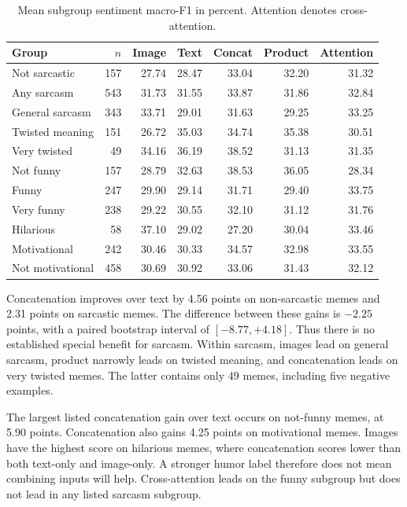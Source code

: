 \documentclass[11pt,a4paper]{article}
\begin{document}
\begin{table}[htbp]
\centering\small
\begin{tabular}{lrrrrrr}
\toprule
Group & $n$ & Image & Text & Concat & Product & Attention \\
\midrule
Not sarcastic & 157 & 27.74 & 28.47 & 33.04 & 32.20 & 31.32 \\
Any sarcasm & 543 & 31.73 & 31.55 & 33.87 & 31.86 & 32.84 \\
General sarcasm & 343 & 33.71 & 29.01 & 31.63 & 29.25 & 33.25 \\
Twisted meaning & 151 & 26.72 & 35.03 & 34.74 & 35.38 & 30.51 \\
Very twisted & 49 & 34.16 & 36.19 & 38.52 & 31.13 & 31.35 \\
Not funny & 157 & 28.79 & 32.63 & 38.53 & 36.05 & 28.34 \\
Funny & 247 & 29.90 & 29.14 & 31.71 & 29.40 & 33.75 \\
Very funny & 238 & 29.22 & 30.55 & 32.10 & 31.12 & 31.76 \\
Hilarious & 58 & 37.10 & 29.02 & 27.20 & 30.04 & 33.46 \\
Motivational & 242 & 30.46 & 30.33 & 34.57 & 32.98 & 33.55 \\
Not motivational & 458 & 30.69 & 30.92 & 33.06 & 31.43 & 32.12 \\
\bottomrule
\end{tabular}
\caption{Mean subgroup sentiment macro-F1 in percent. Attention denotes cross-attention.}
\label{tab:groups}
\end{table}

Concatenation improves over text by 4.56 points on non-sarcastic memes and 2.31 points on sarcastic memes. The difference between these gains is $-2.25$ points, with a paired bootstrap interval of $[-8.77,+4.18]$. Thus there is no established special benefit for sarcasm. Within sarcasm, images lead on general sarcasm, product narrowly leads on twisted meaning, and concatenation leads on very twisted memes. The latter contains only 49 memes, including five negative examples.

The largest listed concatenation gain over text occurs on not-funny memes, at 5.90 points. Concatenation also gains 4.25 points on motivational memes. Images have the highest score on hilarious memes, where concatenation scores lower than both text-only and image-only. A stronger humor label therefore does not mean combining inputs will help. Cross-attention leads on the funny subgroup but does not lead in any listed sarcasm subgroup.
\end{document}
